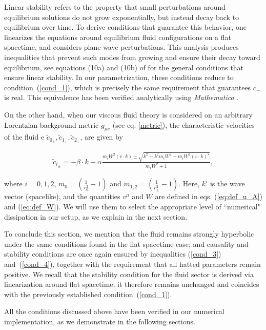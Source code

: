 \documentclass[prd,aps,twocolumn,floats,floatfix,nofootinbib,superscriptaddress] {revtex4-1}
\begin{document}
Linear stability refers to the property that small perturbations around equilibrium solutions do not grow exponentially, but instead decay back to equilibrium over time. To derive conditions that guarantee this behavior, one linearizes the equations around equilibrium fluid configurations on a  flat spacetime, and considers plane-wave perturbations. This analysis produces inequalities that prevent such modes from growing and ensure their decay toward equilibrium, see equations (10a) and (10b) of \cite{Bemfica:2019knx} for the general conditions that ensure linear stability. In our parametrization, these conditions reduce to condition~(\ref{cond_1}), which is precisely the same requirement that guarantees $c_-$ is real. This equivalence has been verified analytically using \textit{Mathematica} \cite{WolframResearch.Mathematica1}.

On the other hand, when our viscous fluid theory is considered on an arbitrary Lorentzian background metric $g_{\mu \nu} $ (see eq. \eqref{metric}), the characteristic velocities of the fluid e $\tilde{c}_{0_{\pm}}, \tilde{c}_{1_{\pm}}, \tilde{c}_{2_{\pm}}$, are given by
\begin{widetext}
\begin{align}
 \tilde{c}_{i_{\pm}} = -\beta \cdot k + \alpha \frac{m_i W^2 (v \cdot k) \pm \sqrt{k^2 + k^2 m_i W^2 - m_i W^2 (v \cdot k)^2}}{m_i W^2 + 1}, \label{vel_w_m}   
\end{align}
\end{widetext}
%
where $i = 0, 1, 2$,  $m_0 = \left( \frac{1}{c_0^2} - 1 \right)$ and $m_{1,2} = \left( \frac{1}{c_{\pm}^2} - 1 \right)$. Here, $k^i$ is the wave vector (spacelike), and the quantities $v^{\mu}$ and $W$ are defined in eqs. (\ref{eq:def_u_A}) and (\ref{eq:def_W}). We will use them to select the appropriate level of ``numerical" dissipation in our setup, as we explain in the next section. 

To conclude this section, we mention that the fluid remains strongly hyperbolic under the same conditions found in the flat spacetime case; and causality and stability conditions are once again ensured by inequalities
(\ref{cond_3}) and~(\ref{cond_4}), together with the requirement that all hatted parameters remain positive. We recall that the stability condition for the fluid sector is derived via linearization around flat spacetime; it therefore remains unchanged and coincides with the previously established condition~(\ref{cond_1}).

All the conditions discussed above have been verified in our numerical implementation, as we demonstrate in the following sections.
\end{document}
